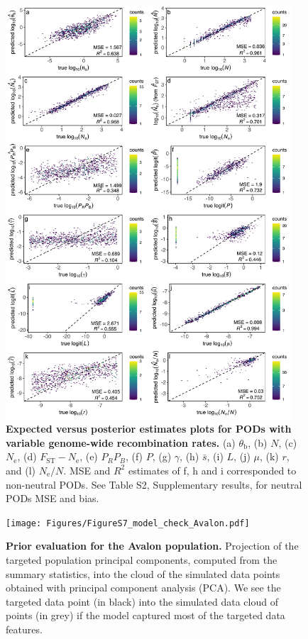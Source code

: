 \documentclass[a4paper, 12pt]{article}
\begin{document}
\begin{figure}[ht]
  \centering
  \includegraphics[width=0.95\textwidth]{Figures/FigureS6_posterior_plots_recombination.pdf}
  \small\caption{\textbf{Expected versus posterior estimates plots for PODs with variable genome-wide recombination rates.} (a) $\theta_{\mathrm{b}}$, (b) $N$, (c) $N_{\mathrm{e}}$, (d) $F_{\mathrm{ST}}-N_{\mathrm{e}}$, (e) $P_RP_B$, (f) $P$, (g) $\gamma$, (h) $\bar{s}$, (i) $L$, (j) $\mu$, (k) $r$, and (l) $N_{\mathrm{e}}/N$. MSE and $R^2$ estimates of f, h and i corresponded to non-neutral PODs. See Table S2, Supplementary results, for neutral PODs MSE and bias.}
  \label{fig:supple_pods_variable_recomb}
\end{figure}

\begin{figure}[ht]
  \centering
  \texttt{[image: Figures/FigureS7\_model\_check\_Avalon.pdf]}
  \small\caption{\textbf{Prior evaluation for the Avalon population.} Projection of the targeted population principal components, computed from the summary statistics, into the cloud of the simulated data points obtained with principal component analysis (PCA). We see the targeted data point (in black) into the simulated data cloud of points (in grey) if the model captured most of the targeted data features.}
  \label{fig:supple_model_check_avalon}
\end{figure}
\end{document}
